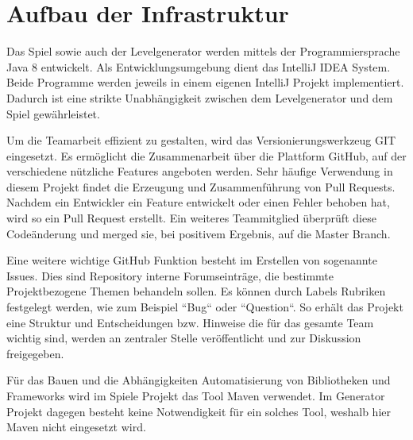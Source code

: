 \section{Aufbau der Infrastruktur}

Das Spiel sowie auch der Levelgenerator werden mittels der Programmiersprache Java 8 entwickelt. 
Als Entwicklungsumgebung dient das IntelliJ IDEA System. Beide Programme werden jeweils in einem eigenen IntelliJ Projekt implementiert. Dadurch ist eine strikte Unabhängigkeit zwischen dem Levelgenerator und dem Spiel gewährleistet.

Um die Teamarbeit effizient zu gestalten, wird das Versionierungswerkzeug GIT eingesetzt. Es ermöglicht die Zusammenarbeit über die Plattform GitHub, auf der verschiedene nützliche Features angeboten werden. Sehr häufige Verwendung in diesem Projekt findet die Erzeugung und Zusammenführung von Pull Requests. Nachdem ein Entwickler ein Feature entwickelt oder einen Fehler behoben hat, wird so ein Pull Request erstellt. Ein weiteres Teammitglied überprüft diese Codeänderung und merged sie, bei positivem Ergebnis, auf die Master Branch.

Eine weitere wichtige GitHub Funktion besteht im Erstellen von sogenannte Issues. Dies sind Repository interne Forumseinträge, die bestimmte Projektbezogene Themen behandeln sollen. Es können durch Labels Rubriken festgelegt werden, wie zum Beispiel ``Bug`` oder ``Question``. So erhält das Projekt eine Struktur und Entscheidungen bzw. Hinweise die für das gesamte Team wichtig sind, werden an zentraler Stelle veröffentlicht und zur Diskussion freigegeben.

Für das Bauen und die Abhängigkeiten Automatisierung von Bibliotheken und Frameworks wird im Spiele Projekt das Tool Maven verwendet. Im Generator Projekt dagegen besteht keine Notwendigkeit für ein solches Tool, weshalb hier Maven nicht eingesetzt wird.

